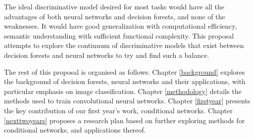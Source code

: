 The ideal discriminative model desired for most tasks would have all the advantages of both neural networks and decision forests, and none of the weaknesses. It would have good generalization with computational efficiency, semantic understanding with sufficient functional complexity. This proposal attempts to explore the continuum of discriminative models that exist between decision forests and neural networks to try and find such a balance.

The rest of this proposal is organised as follows: Chapter \ref{background} explores the background of decision forests, neural networks and their applications, with particular emphasis on image classification. Chapter \ref{methodology} details the methods used to train convolutional neural networks. Chapter \ref{firstyear} presents the key contribution of our first year's work, conditional networks. Chapter \ref{nexttwoyears} proposes a research plan based on further exploring methods for conditional networks, and applications thereof.

